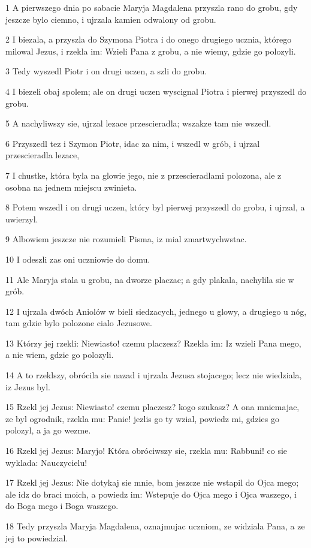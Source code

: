 \par 1 A pierwszego dnia po sabacie Maryja Magdalena przyszla rano do grobu, gdy jeszcze bylo ciemno, i ujrzala kamien odwalony od grobu.
\par 2 I biezala, a przyszla do Szymona Piotra i do onego drugiego ucznia, którego milowal Jezus, i rzekla im: Wzieli Pana z grobu, a nie wiemy, gdzie go polozyli.
\par 3 Tedy wyszedl Piotr i on drugi uczen, a szli do grobu.
\par 4 I biezeli obaj spolem; ale on drugi uczen wyscignal Piotra i pierwej przyszedl do grobu.
\par 5 A nachyliwszy sie, ujrzal lezace przescieradla; wszakze tam nie wszedl.
\par 6 Przyszedl tez i Szymon Piotr, idac za nim, i wszedl w grób, i ujrzal przescieradla lezace,
\par 7 I chustke, która byla na glowie jego, nie z przescieradlami polozona, ale z osobna na jednem miejscu zwinieta.
\par 8 Potem wszedl i on drugi uczen, który byl pierwej przyszedl do grobu, i ujrzal, a uwierzyl.
\par 9 Albowiem jeszcze nie rozumieli Pisma, iz mial zmartwychwstac.
\par 10 I odeszli zas oni uczniowie do domu.
\par 11 Ale Maryja stala u grobu, na dworze placzac; a gdy plakala, nachylila sie w grób.
\par 12 I ujrzala dwóch Aniolów w bieli siedzacych, jednego u glowy, a drugiego u nóg, tam gdzie bylo polozone cialo Jezusowe.
\par 13 Którzy jej rzekli: Niewiasto! czemu placzesz? Rzekla im: Iz wzieli Pana mego, a nie wiem, gdzie go polozyli.
\par 14 A to rzeklszy, obrócila sie nazad i ujrzala Jezusa stojacego; lecz nie wiedziala, iz Jezus byl.
\par 15 Rzekl jej Jezus: Niewiasto! czemu placzesz? kogo szukasz? A ona mniemajac, ze byl ogrodnik, rzekla mu: Panie! jezlis go ty wzial, powiedz mi, gdzies go polozyl, a ja go wezme.
\par 16 Rzekl jej Jezus: Maryjo! Która obróciwszy sie, rzekla mu: Rabbuni! co sie wyklada: Nauczycielu!
\par 17 Rzekl jej Jezus: Nie dotykaj sie mnie, bom jeszcze nie wstapil do Ojca mego; ale idz do braci moich, a powiedz im: Wstepuje do Ojca mego i Ojca waszego, i do Boga mego i Boga waszego.
\par 18 Tedy przyszla Maryja Magdalena, oznajmujac uczniom, ze widziala Pana, a ze jej to powiedzial.
